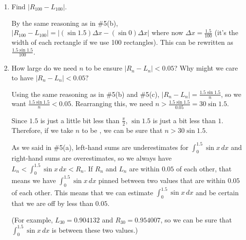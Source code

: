 \documentclass[main]{subfiles}
\begin{document}
\begin{enumerate}[resume]
{\begin{enumerate}
  \item
    \begin{problem}[\stretch{0.5}]
      Find $|R_{100} - L_{100}|$.    
    \end{problem}    

    \begin{solution}
      By the same reasoning as in
      {{{{\#5}}(b)}}, $|R_{100} - L_{100}| =
      |(\sin 1.5) \Delta x - (\sin 0) \Delta x|$ where now $\Delta x =
      \frac{1.5}{100}$ (it's the width of each rectangle if we use 100
      rectangles).  This can be rewritten as $\boxed{ \frac{1.5 \sin
          1.5}{100}}$.
    \end{solution}

  \item

    \begin{problem}[\vfill]
      How large do we need $n$ to be ensure $|R_n - L_n| < 0.05$?  Why
      might we care to have $|R_n - L_n| < 0.05?$
    \end{problem}

    \begin{solution}
      Using the same reasoning as in
      {{{{\#5}}(b)}} and
      {{{{\#5}}(c)}}, $|R_n - L_n| =
      \frac{1.5 \sin 1.5}{n}$, so we want 
      $\frac{1.5 \sin 1.5}{n} < 0.05$.  Rearranging this, we need $n >
      \frac{1.5 \sin 1.5}{0.05} = 30 \sin 1.5$.

      Since $1.5$ is just a little bit less than $\frac{\pi}{2}$, $\sin
      1.5$ is just a bit less than $1$.  Therefore, if we take $n$ to be
      , we can be sure that $n > 30 \sin 1.5$. 

      As we said in {{{{\#5}}(a)}}, left-hand sums
      are underestimates for $\displaystyle \int_0^{1.5} \sin x\,dx$ and
      right-hand sums are overestimates, so we always have $\displaystyle
      L_n < \int_0^{1.5} \sin x\,dx < R_n$.  If $R_n$ and $L_n$ are within
      $0.05$ of each other, that means we have $\displaystyle \int_0^{1.5}
      \sin x\,dx$ pinned between two values that are within $0.05$ of each
      other.  This means that we can estimate $\displaystyle \int_0^{1.5}
      \sin x\,dx$ and be certain that we are off by less than $0.05$.

      (For example, $L_{30} = 0.904132$ and $R_{30} = 0.954007$, so we can
      be sure that $\displaystyle \int_0^{1.5} \sin x\,dx$ is between
      these two values.)
    \end{solution}

  \end{enumerate}
}
\end{enumerate}
\end{document}

